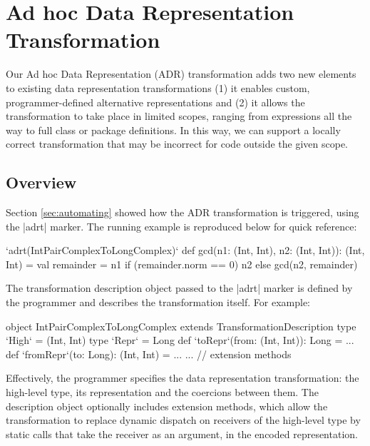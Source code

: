 \section{Ad hoc Data Representation Transformation}
\label{sec:ildl}

Our Ad hoc Data Representation (ADR) transformation adds two new
elements to existing data representation transformations (1) it
enables custom, programmer-defined alternative representations and
(2) it allows the transformation to take place in limited scopes,
ranging from expressions all the way to full class or package
definitions. In this way, we can support a locally correct
transformation that may be incorrect for code outside the given scope.

\subsection{Overview}
\label{sec:ildl:user-story}

Section \ref{sec:automating} showed how the ADR transformation is triggered, using the |adrt| marker. The running example is reproduced below for quick
reference:

\begin{lstlisting-nobreak}
`adrt(IntPairComplexToLongComplex)` {
  def gcd(n1: (Int, Int), n2: (Int, Int)): (Int, Int) = {
    val remainder = n1 %
    if (remainder.norm == 0) n2 else gcd(n2, remainder)
  }
}
\end{lstlisting-nobreak}

The transformation description object passed to the |adrt| marker is defined by the programmer and describes the transformation itself. For example:

\begin{lstlisting-nobreak}
object IntPairComplexToLongComplex extends TransformationDescription {
  type `High` = (Int, Int)
  type `Repr` = Long
  def `toRepr`(from: (Int, Int)): Long = ...
  def `fromRepr`(to: Long): (Int, Int) = ...
  ... // extension methods
}
\end{lstlisting-nobreak}

Effectively, the programmer specifies the data representation transformation: the high-level type, its representation and the coercions between them. The description object optionally includes extension methods, which allow the transformation to replace dynamic dispatch on receivers of the high-level type by static calls that take the receiver as an argument, in the encoded representation.

